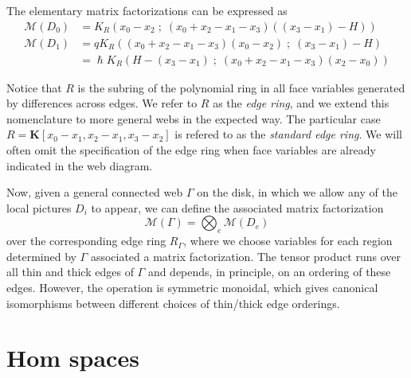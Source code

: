 \documentclass{article}
\newcommand{\DD}{\mathcal{D}}
\renewcommand{\sc}{\; ; \;}
\newcommand{\maf}{\mathcal{M}}
\DeclareMathOperator{\Ext}{Ext}
\theoremstyle{plain} %
\newtheorem{lemma}[theorem]{Lemma}
\theoremstyle{definition} %
\theoremstyle{remark} %
\begin{document}


The elementary matrix factorizations can be expressed as
\begin{align*}
	\maf(D_0)
	&
	=K_R(x_0-x_2\sc(x_0+x_2-x_1-x_3)((x_3-x_1)-H))
	\\
	\maf(D_1)    
	&
	= qK_R((x_0+x_2-x_1-x_3)(x_0-x_2)\sc (x_3-x_1)-H)
	\\
	&
	=\hslash K_R(H-(x_3-x_1)\sc(x_0+x_2-x_1-x_3)(x_2-x_0))
\end{align*}

Notice that $R$ is the subring of the polynomial ring in all face variables generated by differences across edges. We refer to $R$ as the \emph{edge ring}, and we extend this nomenclature to more general webs in the expected way. The particular case $R=\mathbf K[x_0-x_1,x_2-x_1,x_3-x_2]$ is refered to as the \emph{standard edge ring}. We will often omit the specification of the edge ring when face variables are already indicated in the web diagram.

Now, given a general connected web $\Gamma$ on the disk, in which we allow any of the local pictures $D_i$ to appear, we can define the associated matrix factorization
$$
	\maf(\Gamma) =\bigotimes_e\maf(D_e)
$$
over the corresponding edge ring $R_\Gamma$, where we choose variables for each region determined by $\Gamma$ associated a matrix factorization. The tensor product runs over all thin and thick edges of $\Gamma$ and depends, in principle, on an ordering of these edges. However, the operation is symmetric monoidal, which gives canonical isomorphisms between different choices of thin/thick edge orderings.




\section{Hom spaces}

%
%

%
%
\end{document}
